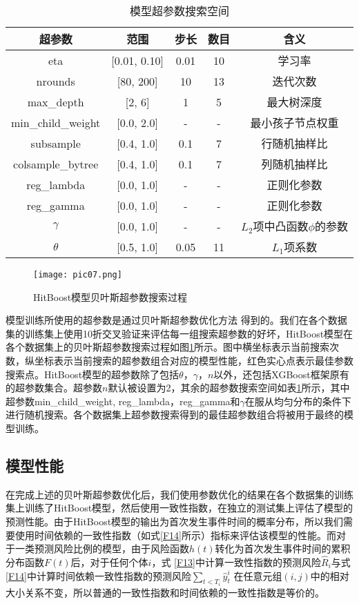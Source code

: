 \begin{table}[h]
\caption{模型超参数搜索空间}
\begin{tabular}{ccccc}
\toprule
超参数 & 范围 & 步长 & 数目 & 含义 \\ 
\midrule
eta & [0.01, 0.10] & 0.01 & 10 & 学习率 \\
nrounds & [80, 200] & 10 & 13 & 迭代次数 \\
max\_depth & [2, 6] & 1 & 5 & 最大树深度 \\
min\_child\_weight & [0.0, 2.0] & - & - & 最小孩子节点权重 \\
subsample & [0.4, 1.0] & 0.1 & 7 & 行随机抽样比 \\
colsample\_bytree & [0.4, 1.0] & 0.1 & 7 & 列随机抽样比 \\
reg\_lambda & [0.0, 1.0] & - & - & 正则化参数 \\
reg\_gamma & [0.0, 1.0] & - & - & 正则化参数 \\
$\gamma$ & [0.0, 1.0] & - & - & $L_2$项中凸函数$\phi$的参数 \\
$\theta$ & [0.5, 1.0] & 0.05 & 11 & $L_1$项系数 \\
\bottomrule
\end{tabular}
\label{table03}
\end{table}

\begin{figure}[H]
\texttt{[image: pic07.png]}
\caption{HitBoost模型贝叶斯超参数搜索过程}
\label{pic07}
\end{figure}

模型训练所使用的超参数是通过贝叶斯超参数优化方法 得到的。我们在各个数据集的训练集上使用10折交叉验证来评估每一组搜索超参数的好坏，HitBoost模型在各个数据集上的贝叶斯超参数搜索过程如图\ref{pic07}所示。图中横坐标表示当前搜索次数，纵坐标表示当前搜索的超参数组合对应的模型性能，红色实心点表示最佳参数搜索点。HitBoost模型的超参数除了包括$\theta$，$\gamma$，$n$以外，还包括XGBoost框架原有的超参数集合。超参数$n$默认被设置为2，其余的超参数搜索空间如表\ref{table03}所示，其中超参数min\_child\_weight, reg\_lambda，reg\_gamma和$\gamma$在服从均匀分布的条件下进行随机搜索。各个数据集上超参数搜索得到的最佳超参数组合将被用于最终的模型训练。

\subsection{模型性能}

在完成上述的贝叶斯超参数优化后，我们使用参数优化的结果在各个数据集的训练集上训练了HitBoost模型，然后使用一致性指数，在独立的测试集上评估了模型的预测性能。由于HitBoost模型的输出为首次发生事件时间的概率分布，所以我们需要使用时间依赖的一致性指数（如式\eqref{F14}所示）指标来评估该模型的性能。而对于一类预测风险比例的模型，由于风险函数$h(t)$转化为首次发生事件时间的累积分布函数$F(t)$后，对于任何个体$i$，式 \eqref{F13}中计算一致性指数的预测风险$\hat{R}_i$与式 \eqref{F14}中计算时间依赖一致性指数的预测风险$\sum_{t<T_i} \hat{y}_t^i$ 在任意元组$(i,j)$中的相对大小关系不变，所以普通的一致性指数和时间依赖的一致性指数是等价的。

